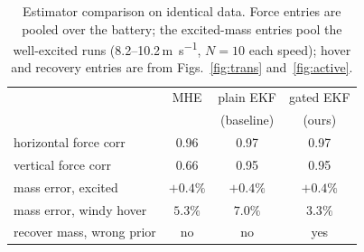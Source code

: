 \documentclass{ieeeaccess}
\def\DIFaddbegin{\color{blue}}\def\DIFaddend{\color{black}}\def\DIFdelbegin{}\def\DIFdelend{} %
\begin{document}
\DIFdelbegin %
\DIFdelend \DIFaddbegin \begin{table}[t]\color{blue}
\centering
\caption{Estimator comparison on identical data. Force entries are pooled over
the battery; the excited-mass entries pool the well-excited runs
(8.2--10.2\,\si{\meter\per\second}, $N{=}10$ each speed); hover and recovery
entries are from Figs.~\ref{fig:trans} and~\ref{fig:active}.}
\label{tab:compare}
\begin{tabular}{lccc}
\toprule
 & MHE & plain EKF & gated EKF \\
 &     & (baseline) & (ours) \\
\midrule
horizontal force corr      & 0.96 & 0.97 & 0.97 \\
vertical force corr        & 0.66 & 0.95 & 0.95 \\
mass error, excited        & $+0.4\%$ & $+0.4\%$ & $+0.4\%$ \\
mass error, windy hover    & $5.3\%$ & $7.0\%$ & $\mathbf{3.3\%}$ \\
recover mass, wrong prior  & no & no & yes \\
\bottomrule
\end{tabular}
\end{table}
\DIFaddend 
\end{document}

